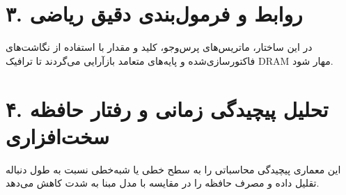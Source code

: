 \documentclass[12pt,a4paper]{article}
\begin{document}
\section*{۳. روابط و فرمول‌بندی دقیق ریاضی}
در این ساختار، ماتریس‌های پرس‌وجو، کلید و مقدار با استفاده از نگاشت‌های فاکتورسازی‌شده و پایه‌های متعامد بازآرایی می‌گردند تا ترافیک DRAM مهار شود.

\section*{۴. تحلیل پیچیدگی زمانی و رفتار حافظه سخت‌افزاری}
این معماری پیچیدگی محاسباتی را به سطح خطی یا شبه‌خطی نسبت به طول دنباله تقلیل داده و مصرف حافظه را در مقایسه با مدل مبنا به شدت کاهش می‌دهد.
\end{document}
